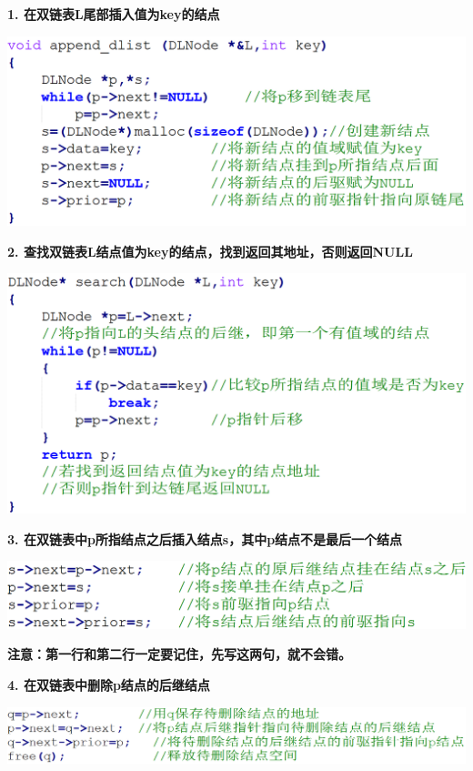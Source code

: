 \textbf{{1. 在双链表L尾部插入值为key的结点}}

\includegraphics[width=6in]{png-jpeg-pics/03268EAA15CD33F53F293BD78E598542.png}

\textbf{{2. 查找双链表L结点值为key的结点，找到返回其地址，否则返回NULL}}

\includegraphics[width=6in]{png-jpeg-pics/01B96410D375D9482DBD49E4733D199A.png}

\textbf{{3.
在双链表中p所指结点之后插入结点s，其中p结点不是最后一个结点}}

\includegraphics[width=6in]{png-jpeg-pics/1E0D67141EAF5766A73E880D92654FFF.png}

\textbf{{注意：第一行和第二行一定要记住，先写这两句，就不会错。}}

\textbf{{4. 在双链表中删除p结点的后继结点}}

\includegraphics[width=6in]{png-jpeg-pics/5F88607817AE7DD214FE9DF244A7CE02.png}
